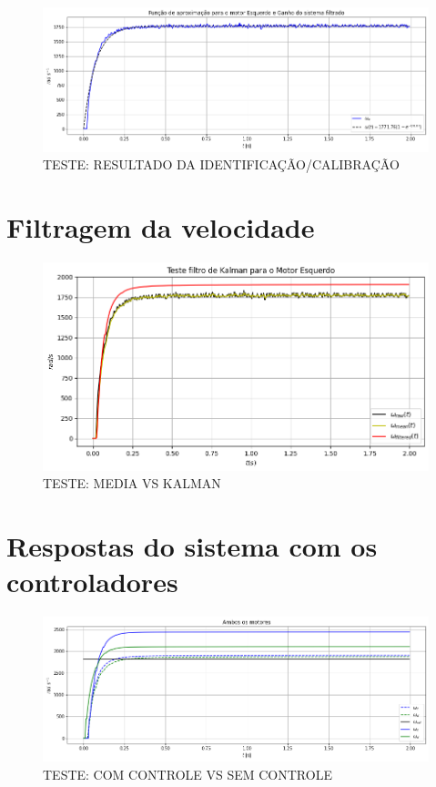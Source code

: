 \begin{figure}[H]
    \centering
    \includegraphics[width=13cm]{figuras/resultados/plot_test_identificacao.png}
    \caption{TESTE: RESULTADO DA IDENTIFICAÇÃO/CALIBRAÇÃO}
\end{figure}

\section{Filtragem da velocidade}

\begin{figure}[H]
    \centering
    \includegraphics[width=13cm]{figuras/resultados/plot_test_media_x_kalman.png}
    \caption{TESTE: MEDIA VS KALMAN}
\end{figure}

\section{Respostas do sistema com os controladores}


\begin{figure}[H]
    \centering
    \includegraphics[width=13cm]{figuras/resultados/plot_test.png}
    \caption{TESTE: COM CONTROLE VS SEM CONTROLE}
\end{figure}

